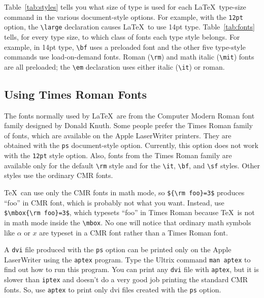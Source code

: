 Table~\ref{tab:styles} tells you what size of type is used for each
\LaTeX\ type-size command in the various document-style options.  For
example, with the {\tt 12pt} option, the \hbox{\verb|\large|}
declaration causes \LaTeX\ to use 14pt type.  Table~\ref{tab:fonts}
tells, for every type size, to which class of fonts each type style
belongs.  For example, in 14pt type, \verb|\bf| uses a preloaded
font and the other five type-style commands use load-on-demand fonts.
Roman (\verb|\rm|) and math italic (\verb|\mit|) fonts are all
preloaded; the \hbox{\verb|\em|} declaration uses either italic
(\verb|\it|) or roman.




\subsection{Using Times Roman Fonts} \label{sec:apple}

The fonts normally used by \LaTeX\ are from the Computer Modern Roman
font family designed by Donald Knuth.  Some people prefer the Times
Roman family of fonts, which are available on the Apple LaserWriter
printers.  They are obtained with the {\tt ps} document-style option.
Currently, this option does not work with the {\tt 12pt} style option.
Also, fonts from the Times Roman family are available only for the
default \verb|\rm| style and for the \verb|\it|, \verb|\bf|, and
\verb|\sf| styles.  Other styles use the ordinary CMR fonts.

\TeX\ can use only the CMR fonts in math mode, so \verb|${\rm foo}=3$|
produces ``foo'' in CMR font, which is probably not what you want.
Instead, use \verb|$\mbox{\rm foo}=3$|, which typesets ``foo'' in Times
Roman because \TeX\ is not in math mode inside the \verb|\mbox|.  No
one will notice that ordinary math symbols like $\alpha$ or $x$ are
typeset in a CMR font rather than a Times Roman font.

A {\tt dvi} file produced with the {\tt ps} option can be printed only
on the Apple LaserWriter using the {\tt aptex\/} program.  Type the
Ultrix command {\tt man~aptex} to find out how to run this program.
You can print any {\tt dvi} file with {\tt aptex}, but it is slower
than {\tt iptex} and doesn't do a very good job printing the
standard CMR fonts.  So, use {\tt aptex} to print only {dvi} files
created with the {\tt ps} option.

